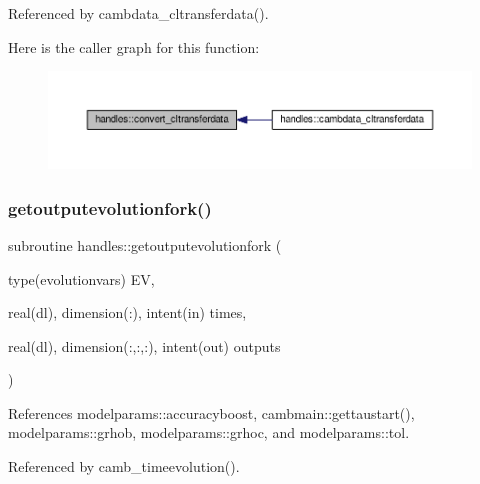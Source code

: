 Referenced by cambdata\+\_\+cltransferdata().

Here is the caller graph for this function\+:
\nopagebreak
\begin{figure}[H]
\begin{center}
\leavevmode
\includegraphics[width=350pt]{namespacehandles_abfc0adee06cc42379adb5fee674a9611_icgraph}
\end{center}
\end{figure}
\mbox{\label{namespacehandles_abde0c82099eadde40e5f09d895ec6ebb}} 
\subsubsection{\texorpdfstring{getoutputevolutionfork()}{getoutputevolutionfork()}}
{\footnotesize\ttfamily subroutine handles\+::getoutputevolutionfork (\begin{DoxyParamCaption}\item[{type(evolutionvars)}]{EV,  }\item[{real(dl), dimension(\+:), intent(in)}]{times,  }\item[{real(dl), dimension(\+:,\+:,\+:), intent(out)}]{outputs }\end{DoxyParamCaption})}



References modelparams\+::accuracyboost, cambmain\+::gettaustart(), modelparams\+::grhob, modelparams\+::grhoc, and modelparams\+::tol.



Referenced by camb\+\_\+timeevolution().

